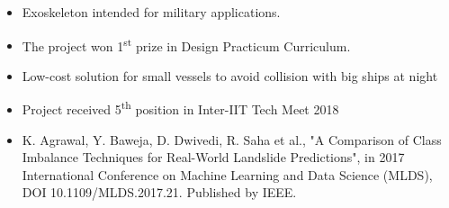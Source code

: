 \begin{itemize}
\item Exoskeleton intended for military applications.
\item The project won 1\textsuperscript{st} prize in Design Practicum Curriculum.
\end{itemize}
\smallskip
\smallskip

\begin{itemize}
\item Low-cost solution for small vessels to avoid collision with big ships at night
\item Project received 5\textsuperscript{th} position in Inter-IIT Tech Meet 2018
\end{itemize}
\smallskip
\smallskip




\smallskip
\begin{itemize}
\item K. Agrawal, Y. Baweja, D. Dwivedi, R. Saha et al., "A Comparison of Class Imbalance Techniques for Real-World Landslide Predictions", in 2017 International Conference on Machine Learning and Data Science (MLDS), DOI 10.1109/MLDS.2017.21. Published by IEEE.
\end{itemize}
